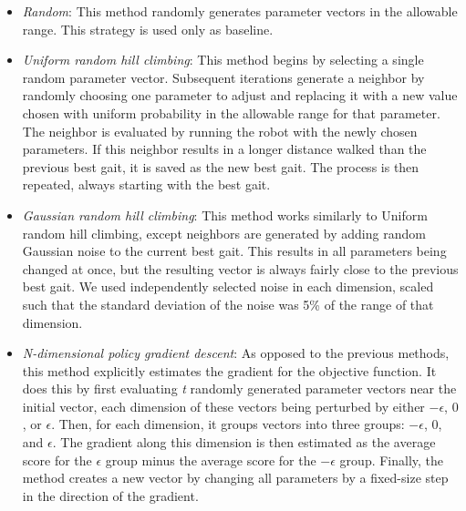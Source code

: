 \begin{itemize}

\item \emph{Random}: This method randomly generates parameter vectors
  in the allowable range. This strategy is used only as baseline.

\item \emph{Uniform random hill climbing}: This method begins by
  selecting a single random parameter vector.  Subsequent iterations
  generate a neighbor by randomly choosing one parameter to adjust and
  replacing it with a new value chosen with uniform probability in the
  allowable range for that parameter. The neighbor is evaluated by
  running the robot with the newly chosen parameters. If this neighbor
  results in a longer distance walked than the previous best gait, it
  is saved as the new best gait. The process is then repeated, always
  starting with the best gait.

\item \emph{Gaussian random hill climbing}: This method works
  similarly to Uniform random hill climbing, except neighbors are
  generated by adding random Gaussian noise to the current best gait.
  This results in all parameters being changed at once, but the
  resulting vector is always fairly close to the previous best gait.
  We used independently selected noise in each dimension, scaled such
  that the standard deviation of the noise was 5\% of the range of
  that dimension.

\item \emph{N-dimensional policy gradient descent}: As opposed to the
  previous methods, this method explicitly estimates the gradient for
  the objective function. It does this by first evaluating \emph{t}
  randomly generated parameter vectors near the initial vector, each
  dimension of these vectors being perturbed by either $-\epsilon$,
  $0$, or $\epsilon$. Then, for each dimension, it groups vectors into
  three groups: $-\epsilon$, $0$, and $\epsilon$.  The gradient along
  this dimension is then estimated as the average score for the
  $\epsilon$ group minus the average score for the $-\epsilon$
  group. Finally, the method creates a new vector by changing all
  parameters by a fixed-size step in the direction of the gradient.


\end{itemize}
